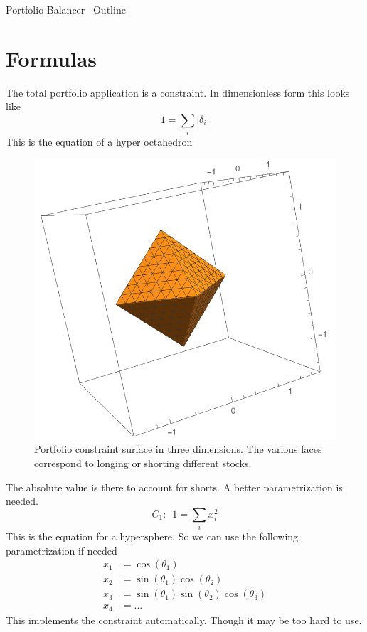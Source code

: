 \documentclass[10pt,letterpaper,oneside]{article}
\begin{document}
\large{Portfolio Balancer-- Outline}
\section{Formulas}

The total portfolio application is a constraint. In dimensionless form this looks like
\begin{equation}
1=\sum_{i}|\delta_i|
\end{equation}
This is the equation of a hyper octahedron
\begin{figure}[H]
\includegraphics[scale=1]{tetra}
\caption{Portfolio constraint surface in three dimensions. The various faces correspond to longing or shorting different stocks.}
\end{figure}

The absolute value is there to account for shorts. A better parametrization is needed.
\begin{equation}
C_1:\,\,\,1=\sum_{i}x_i^2
\end{equation}
This is the equation for a hypersphere. So we can use the following parametrization if needed
\begin{equation}
\begin{split}
x_1&=\cos{(\theta_1)}\\
x_2&=\sin{(\theta_1)}\cos{(\theta_2)}\\
x_3&=\sin{(\theta_1)}\sin{(\theta_2)}\cos{(\theta_3)}\\
x_4&=...
\end{split}
\end{equation}
This implements the constraint automatically. Though it may be too hard to use.
\end{document}
